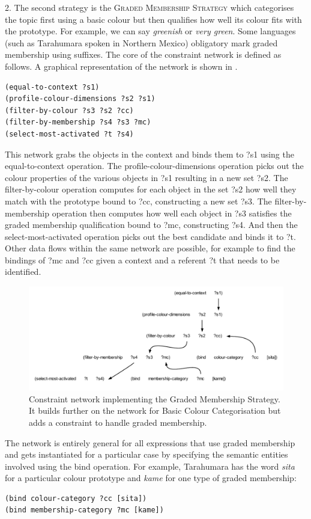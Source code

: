 2. The second strategy is the {\scshape Graded Membership Strategy} which categorises the topic first using 
a basic colour but then qualifies how well its colour fits with the prototype. For example, we can say \textit{greenish} or
\textit{very green}. Some languages (such as Tarahumara spoken in Northern Mexico) obligatory mark graded membership using 
suffixes. The core of the constraint network is defined as follows. A graphical representation of the network is shown
in . 
\begin{verbatim}
(equal-to-context ?s1) 
(profile-colour-dimensions ?s2 ?s1)
(filter-by-colour ?s3 ?s2 ?cc)
(filter-by-membership ?s4 ?s3 ?mc)
(select-most-activated ?t ?s4)
\end{verbatim}
This network grabs the objects in the context and binds them to ?s1 using the equal-to-context operation. 
The profile-colour-dimensions operation picks out the colour properties of the various objects in ?s1 resulting in 
a new set ?s2. The filter-by-colour operation computes for each object in the set ?s2
how well they match with the prototype bound to ?cc, constructing a new set ?s3. The filter-by-membership operation 
then computes how well 
each object in ?s3 satisfies the graded membership qualification bound to ?mc, 
constructing ?s4. And then the select-most-activated operation picks out the best candidate and binds it to ?t. 
Other data flows within the same network are possible, for example to find the bindings of ?mc and ?cc given 
a context and a referent ?t that needs to be identified. 


\begin{figure}[htbp]
  \centerline{\includegraphics[width=1.0\textwidth]{chap11/figs/graded.pdf}}
\caption{\label{fig:graded}Constraint network implementing the Graded Membership Strategy. It builds further on the network for Basic Colour
Categorisation but adds a constraint to handle graded membership. }
\end{figure}
\enlargethispage{1\baselineskip}
The network is entirely general for all expressions that use graded membership and gets instantiated for a particular 
case by specifying the semantic entities involved using the bind operation. For example, Tarahumara has the word 
\textit{sita} for a particular colour prototype and \textit{kame} for one type of graded membership: 
\begin{verbatim}
(bind colour-category ?cc [sita])
(bind membership-category ?mc [kame]) 
\end{verbatim}

